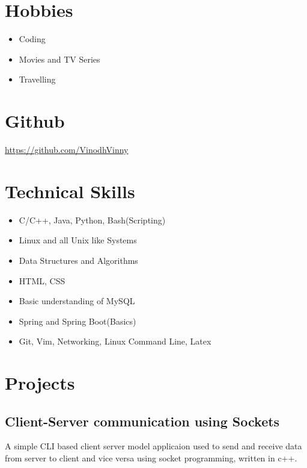 \documentclass[11pt,a4paper]{article}
\begin{document}
\begin{tcolorbox}
\begin{minipage}[t]{9cm}
\begin{tcolorbox}[grow to left by=0.6cm,colback=gray!25,colframe=white]
			\section*{Hobbies}
			\begin{itemize}[leftmargin=3mm]
			\item{Coding}
			\item{Movies and TV Series}
			\item{Travelling}
			\end{itemize}

			\section*{Github}
			{\color{blue}\underline{https://github.com/VinodhVinny}}
			\vspace*{1cm}
		\end{tcolorbox}
	\end{minipage}
	\begin{minipage}[t]{10cm}
	\vspace*{-0.5cm}
	\begin{tcolorbox}[grow to right by=0.75cm,colframe=white,colback=white]
		\section*{Technical Skills}
		\begin{itemize}[leftmargin=3mm]
			\item{C/C++, Java, Python, Bash(Scripting)}
			\item{Linux and all Unix like Systems}
			\item{Data Structures and Algorithms}
			\item{HTML, CSS}
			\item{Basic understanding of MySQL}
			\item{Spring and Spring Boot(Basics)}
			\item{Git, Vim, Networking, Linux Command Line, Latex}
		\end{itemize}

		\section*{Projects}
			\subsection*{Client-Server communication using Sockets}
			A simple CLI based client server model applicaion used to send and receive data from
			server to client and vice versa using socket programming, written in c++.

\end{tcolorbox}
\end{minipage}
\end{tcolorbox}
\end{document}
